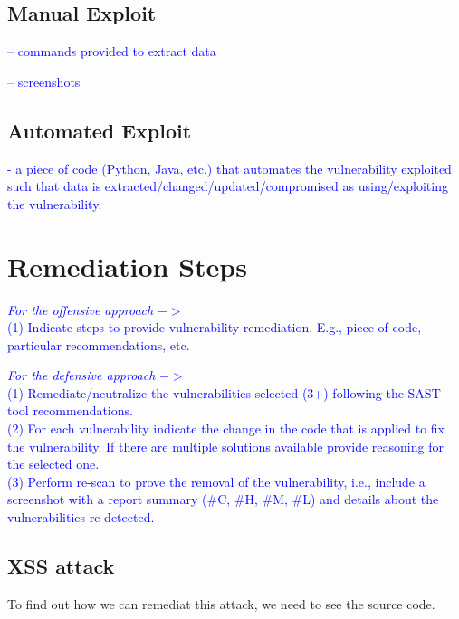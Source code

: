 \documentclass{article}
\begin{document}
\subsection{Manual Exploit}
\label{}

\textcolor{blue}{-- commands provided to extract data}

\textcolor{blue}{-- screenshots}


\subsection{Automated Exploit}
\label{}
\textcolor{blue}{- a piece of code (Python, Java, etc.) that automates the vulnerability exploited such that data is extracted/changed/updated/compromised as using/exploiting the vulnerability.}



\section{Remediation Steps}
\label{}

\textcolor{blue}{\textit{For the offensive approach} $->$\\
    (1) Indicate steps to provide vulnerability remediation. E.g., piece of code, particular recommendations, etc.}

\textcolor{blue}{\textit{For the defensive approach} $->$\\
    (1) Remediate/neutralize the vulnerabilities selected (3+) following the SAST tool recommendations.}\\
\textcolor{blue}{(2) For each vulnerability indicate the change in the code that is applied to fix the vulnerability. If there are multiple solutions available provide reasoning for the selected one.} \\
\textcolor{blue}{(3) Perform re-scan to prove the removal of the vulnerability, i.e., include a screenshot with a report summary (\#C, \#H, \#M, \#L) and details about the vulnerabilities re-detected.}

\subsection{XSS attack}
\label{xss-attack}
To find out how we can remediat this attack, we need to see the source code.
\end{document}
